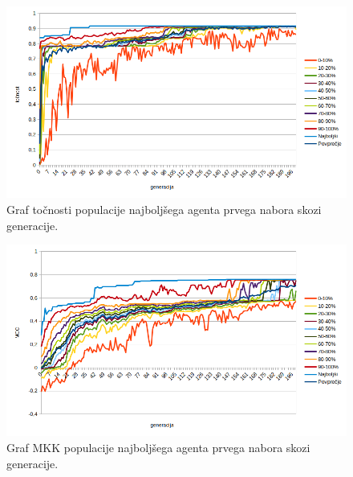 \begin{figure}[H]
    \begin{center}
        \includegraphics[width=13cm]{shuttle/1/acc}
    \end{center}
    \caption{Graf točnosti populacije najboljšega agenta prvega nabora skozi generacije.}
    \label{fig:statlog_acc_1}
\end{figure}

\begin{figure}[H]
    \begin{center}
        \includegraphics[width=13cm]{shuttle/1/mcc}
    \end{center}
    \caption{Graf MKK populacije najboljšega agenta prvega nabora skozi generacije.}
    \label{fig:statlog_mcc_1}
\end{figure}

